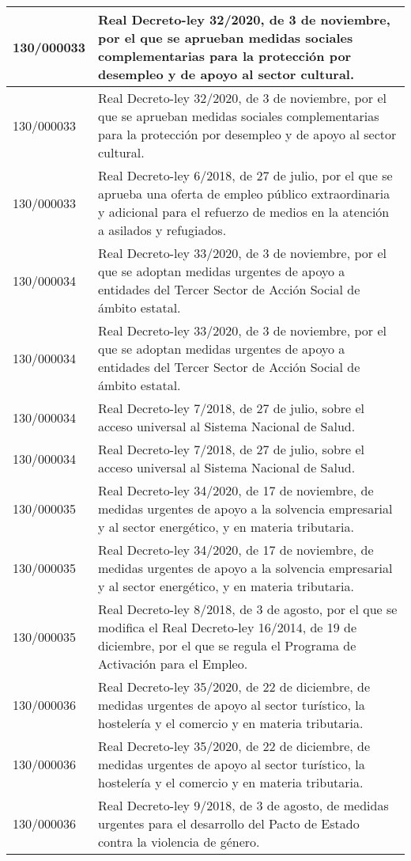 {\begin{table}[H]
\begin{center}
\begin{tabularx}{\linewidth}{| l | X |}
\hline
130/000033 & Real Decreto-ley 32/2020, de 3 de noviembre, por el que se aprueban medidas sociales complementarias para la protección por desempleo y de apoyo al sector cultural. \\
\hline
130/000033 & Real Decreto-ley 32/2020, de 3 de noviembre, por el que se aprueban medidas sociales complementarias para la protección por desempleo y de apoyo al sector cultural. \\
\hline
130/000033 & Real Decreto-ley 6/2018, de 27 de julio, por el que se aprueba una oferta de empleo público extraordinaria y adicional para el refuerzo de medios en la atención a asilados y refugiados. \\
\hline
130/000034 & Real Decreto-ley 33/2020, de 3 de noviembre, por el que se adoptan medidas urgentes de apoyo a entidades del Tercer Sector de Acción Social de ámbito estatal. \\
\hline
130/000034 & Real Decreto-ley 33/2020, de 3 de noviembre, por el que se adoptan medidas urgentes de apoyo a entidades del Tercer Sector de Acción Social de ámbito estatal. \\
\hline
130/000034 & Real Decreto-ley 7/2018, de 27 de julio, sobre el acceso universal al Sistema Nacional de Salud. \\
\hline
130/000034 & Real Decreto-ley 7/2018, de 27 de julio, sobre el acceso universal al Sistema Nacional de Salud. \\
\hline
130/000035 & Real Decreto-ley 34/2020, de 17 de noviembre, de medidas urgentes de apoyo a la solvencia empresarial y al sector energético, y en materia tributaria. \\
\hline
130/000035 & Real Decreto-ley 34/2020, de 17 de noviembre, de medidas urgentes de apoyo a la solvencia empresarial y al sector energético, y en materia tributaria. \\
\hline
130/000035 & Real Decreto-ley 8/2018, de 3 de agosto, por el que se modifica el Real Decreto-ley 16/2014, de 19 de diciembre, por el que se regula el Programa de Activación para el Empleo. \\
\hline
130/000036 & Real Decreto-ley 35/2020, de 22 de diciembre, de medidas urgentes de apoyo al sector turístico, la hostelería y el comercio y en materia tributaria. \\
\hline
130/000036 & Real Decreto-ley 35/2020, de 22 de diciembre, de medidas urgentes de apoyo al sector turístico, la hostelería y el comercio y en materia tributaria. \\
\hline
130/000036 & Real Decreto-ley 9/2018, de 3 de agosto, de medidas urgentes para el desarrollo del Pacto de Estado contra la violencia de género. \\

\end{tabularx}
\end{center}
\end{table}}
